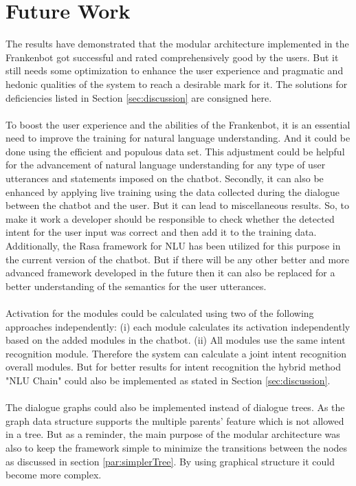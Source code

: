 \section{Future Work}
The results have demonstrated that the modular architecture implemented in the Frankenbot got successful and rated comprehensively good by the users. But it still needs some optimization to enhance the user experience and pragmatic and hedonic qualities of the system to reach a desirable mark for it. The solutions for deficiencies listed in Section \ref{sec:discussion} are consigned here.
\\~\\
To boost the user experience and the abilities of the Frankenbot, it is an essential need to improve the training for natural language understanding. And it could be done using the efficient and populous data set. This adjustment could be helpful for the advancement of natural language understanding for any type of user utterances and statements imposed on the chatbot. Secondly, it can also be enhanced by applying live training using the data collected during the dialogue between the chatbot and the user. But it can lead to miscellaneous results. So, to make it work a developer should be responsible to check whether the detected intent for the user input was correct and then add it to the training data. Additionally, the Rasa framework for NLU has been utilized for this purpose in the current version of the chatbot. But if there will be any other better and more advanced framework developed in the future then it can also be replaced for a better understanding of the semantics for the user utterances.
\\~\\
Activation for the modules could be calculated using two of the following approaches independently: (i) each module calculates its activation independently based on the added modules in the chatbot. (ii) All modules use the same intent recognition module. Therefore the system can calculate a joint intent recognition overall modules. But for better results for intent recognition the hybrid method "NLU Chain" could also be implemented as stated in Section \ref{sec:discussion}. 
\\~\\
The dialogue graphs could also be implemented instead of dialogue trees. As the graph data structure supports the multiple parents' feature which is not allowed in a tree. But as a reminder, the main purpose of the modular architecture was also to keep the framework simple to minimize the transitions between the nodes as discussed in section \ref{par:simplerTree}. By using graphical structure it could become more complex.
